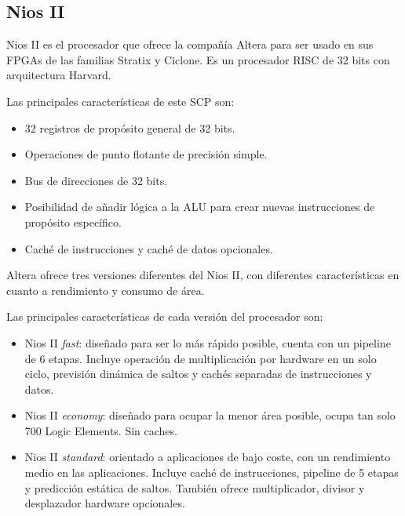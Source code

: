 	\subsection{Nios II}

Nios II es el procesador que ofrece la compañía Altera para ser usado en sus FPGAs de las familias Stratix y Ciclone. Es un procesador RISC de 32 bits con arquitectura Harvard.

Las principales características de este SCP son:
		\begin{itemize}
		  \item  32 registros de propósito general de 32 bits.
	 	 \item  Operaciones de punto flotante de precisión simple.
	 	 \item  Bus de direcciones de 32 bits.
		 \item  Posibilidad de añadir lógica a la ALU para crear nuevas instrucciones de propósito específico.
 		\item Caché de instrucciones y caché de datos opcionales.
		\end{itemize}
  
Altera ofrece tres versiones diferentes del Nios II, con diferentes características en cuanto a rendimiento y consumo de área.

Las principales características de cada versión del procesador son: 
		\begin{itemize}
		  \item Nios II \textit{fast}: diseñado para ser lo más rápido posible, cuenta con un pipeline de 6 etapas. Incluye operación de multiplicación por hardware en un solo ciclo, previsión dinámica de saltos y cachés separadas de instrucciones y datos.
	 	 \item Nios II \textit{economy}: diseñado para ocupar la menor área posible, ocupa tan solo 700 Logic Elements. Sin caches.
 		\item Nios II \textit{standard}: orientado a aplicaciones de bajo coste, con un rendimiento medio en las aplicaciones. Incluye caché de instrucciones, pipeline de 5 etapas y predicción estática de saltos. También ofrece multiplicador, divisor y desplazador hardware opcionales.
		\end{itemize}

